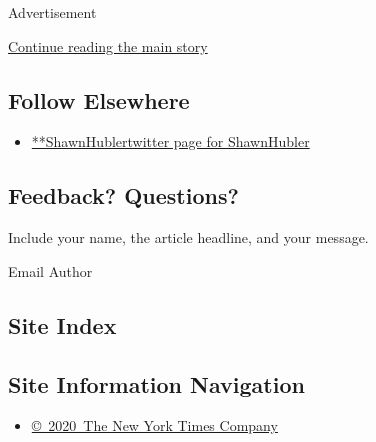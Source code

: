 Advertisement

\protect\hyperlink{after-mid2}{Continue reading the main story}

\hypertarget{follow-elsewhere}{%
\subsection{Follow Elsewhere}\label{follow-elsewhere}}

\begin{itemize}
\tightlist
\item
  \href{https://twitter.com/ShawnHubler}{**ShawnHublertwitter page for
  ShawnHubler}
\end{itemize}

\hypertarget{feedback-questions}{%
\subsection{Feedback? Questions?}\label{feedback-questions}}

Include your name, the article headline, and your message.

Email Author

\hypertarget{site-index}{%
\subsection{Site Index}\label{site-index}}

\hypertarget{site-information-navigation}{%
\subsection{Site Information
Navigation}\label{site-information-navigation}}

\begin{itemize}
\tightlist
\item
  \href{https://help.nytimes3xbfgragh.onion/hc/en-us/articles/115014792127-Copyright-notice}{©~2020~The
  New York Times Company}
\end{itemize}

